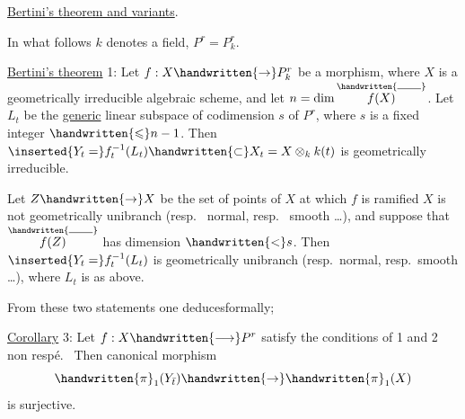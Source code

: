 
\uline{Bertini's theorem and variants}.

In what follows $k$ denotes a field, $P^r=P^r_k$.

\uline{Bertini's theorem} 1: Let $f:X\handwritten{\rightarrow}P^r_k$ be a morphism, where $X$ is a geometrically irreducible algebraic scheme, and let $n=\dim\overset{\handwritten{\rule{1.9em}{.4pt}}}{f(X)}$. Let $L_t$ be the \uline{generic} linear subspace of codimension $s$ of $P^r$, where $s$ is a fixed integer $\handwritten{\leqslant}n-1$. Then $\inserted{Y_t=}f_t^{-1}(L_t)\handwritten{\subset}X_t=X\otimes_k k(t)$ is geometrically irreducible.

  Let $Z\handwritten{\rightarrow}X$  be the set of points of $X$ at which  $f$ is  ramified   $X$ is not geometrically unibranch (resp.\  normal, resp.\  smooth \ldots),  and suppose that $\overset{\handwritten{\rule{1.9em}{.4pt}}}{f(Z)}$ has dimension $\handwritten{<}s$. Then $\inserted{Y_t=}f_t^{-1}(L_t)$ is geometrically unibranch (resp.\ normal, resp.\ smooth \ldots), where $L_t$ is as above.

From these two statements one deduces\handwritten{/}formally;

\uline{Corollary} 3: Let $f:X\handwritten{\longrightarrow}P^r$ satisfy the conditions of 1\handwritten{,} and 2 non respé.\  Then  canonical morphism
\[
\handwritten{\pi}_1(Y_{\bar{t}})\handwritten{\rightarrow}\handwritten{\pi}_1(X)
\]
is surjective.

